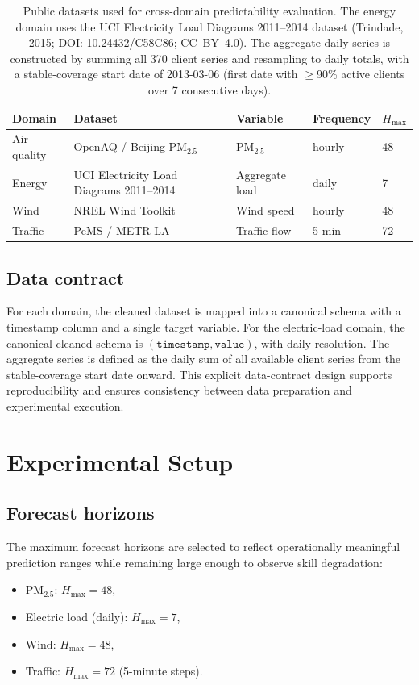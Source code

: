 \documentclass[11pt]{article}
\begin{document}
\begin{table}[h]
\centering
\begin{tabular}{lllll}
\toprule
Domain & Dataset & Variable & Frequency & $H_{\max}$ \\
\midrule
Air quality & OpenAQ / Beijing PM$_{2.5}$ & PM$_{2.5}$ & hourly & 48 \\
Energy & UCI Electricity Load Diagrams 2011--2014 & Aggregate load & daily & 7 \\
Wind & NREL Wind Toolkit & Wind speed & hourly & 48 \\
Traffic & PeMS / METR-LA & Traffic flow & 5-min & 72 \\
\bottomrule
\end{tabular}
\caption{Public datasets used for cross-domain predictability evaluation.
The energy domain uses the UCI Electricity Load Diagrams 2011--2014 dataset (Trindade, 2015; DOI: 10.24432/C58C86; CC~BY~4.0).
The aggregate daily series is constructed by summing all 370 client series and resampling to daily totals, with a stable-coverage start date of 2013-03-06 (first date with $\geq$90\% active clients over 7 consecutive days).}
\label{tab:datasets}
\end{table}

\subsection{Data contract}
For each domain, the cleaned dataset is mapped into a canonical schema with a timestamp column and a single target variable.
For the electric-load domain, the canonical cleaned schema is $(\texttt{timestamp}, \texttt{value})$, with daily resolution.
The aggregate series is defined as the daily sum of all available client series from the stable-coverage start date onward.
This explicit data-contract design supports reproducibility and ensures consistency between data preparation and experimental execution.

\section{Experimental Setup}

\subsection{Forecast horizons}
The maximum forecast horizons are selected to reflect operationally meaningful prediction ranges while remaining large enough to observe skill degradation:
\begin{itemize}
  \item PM$_{2.5}$: $H_{\max}=48$,
  \item Electric load (daily): $H_{\max}=7$,
  \item Wind: $H_{\max}=48$,
  \item Traffic: $H_{\max}=72$ (5-minute steps).
\end{itemize}
\end{document}
